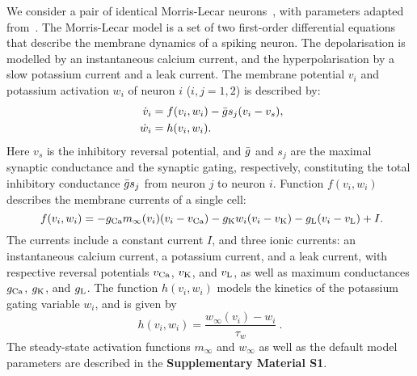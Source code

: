 \documentclass[../manuscript.tex]{subfiles}
\begin{document}
We consider a pair of identical Morris-Lecar neurons~\citep{morris1981}, with parameters
adapted from~\cite{bose2011}.  The Morris-Lecar model is a set of two first-order
differential equations that describe the membrane dynamics of a spiking neuron.  The
depolarisation is modelled by an instantaneous calcium current, and the hyperpolarisation
by a slow potassium current and a leak current.  The membrane potential $v_{i}$ and
potassium activation $w_{i}$ of neuron $i$ ($i, j=1,2$) is described by:
\begin{align}
  ~\label{eq:cell-modelA}
  \dot v_{i} & = f(v_{i}, w_{i}) -\bar g s_j(v_i-v_{s}), \\
  ~\label{eq:cell-modelB}
  \dot w_{i} & =h(v_i,w_i).
\end{align}
Here $v_{s}$ is the inhibitory reversal potential, and $\bar g$ and $s_{j}$ are the maximal
synaptic conductance and the synaptic gating, respectively, constituting the total
inhibitory conductance $\bar g s_{j}$ from neuron $j$ to neuron $i$.  Function $f(v_{i},
w_{i})$ describes the membrane currents of a single cell:
\begin{equation}
  ~\label{eq:memcur}
  f(v_{i}, w_{i}) = -g_{\mathrm{Ca}}m_{\infty}(v_{i})(v_{i}-v_{\mathrm{Ca}}) - g_{\mathrm{K}}w_{i}(v_{i}-v_{\mathrm{K}})-g_{\mathrm{L}}(v_{i}-v_{\mathrm{L}}) + I.
\end{equation}
The currents include a constant current $I$, and three ionic currents: an instantaneous
calcium current, a potassium current, and a leak current, with respective reversal
potentials $v_{\mathrm{Ca}}$, $v_{\mathrm{K}}$, and $v_{\mathrm{L}}$, as well as maximum conductances
$g_{\mathrm{Ca}}$, $g_{\mathrm{K}}$, and $g_{\mathrm{L}}$.  The function $h(v_{i}, w_{i})$ models the kinetics
of the potassium gating variable $w_{i}$, and is given by
\begin{equation}
  h(v_{i}, w_{i})=\frac{w_{\infty}(v_{i})-w_{i}}{\tau_{w}}~\label{eq:h}.
\end{equation}
The steady-state activation functions $m_{\infty}$ and $w_{\infty}$ as well as the default
model parameters are described in the \textbf{Supplementary Material S1}.
\end{document}
